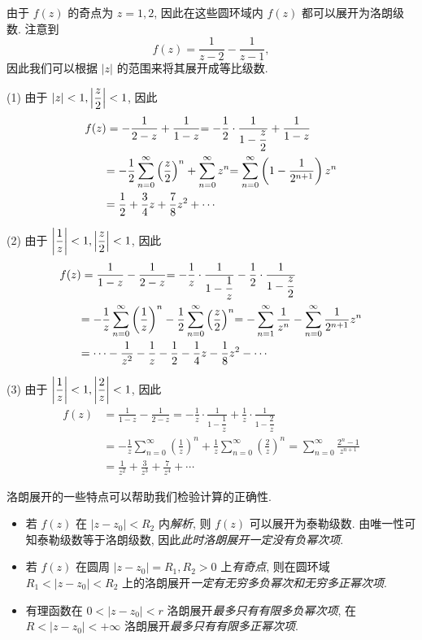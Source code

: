 \documentclass[nocolor,theme=doremi,lang=cn,11pt,chinese,twoside,openright,usesamecnt]{elegantbook}
\newcommand\enumnum[1]{{\mdseries\upshape\textcolor[rgb]{.2,.2,.7}{(#1)}}}
\begin{document}
\begin{solution}
	由于 $f(z)$ 的奇点为 $z=1,2$, 因此在这些圆环域内 $f(z)$ 都可以展开为洛朗级数.
	{注意到
		\[f(z)=\frac1{z-2}-\frac1{z-1},\]
		因此我们可以根据 $|z|$ 的范围来将其展开成等比级数.}

	\enumnum1 由于 $|z|<1,\left|\dfrac z2\right|<1$,
	{因此
		\begin{align*}
			f(z)&=-\frac1{2-z}+\frac1{1-z}
			{=-\frac{1}{2}\cdot\frac1{1-\dfrac z2}+\frac1{1-z}}\\
			&{=-\frac{1}{2}\sum_{n=0}^\infty\left(\frac z2\right)^n+\sum_{n=0}^\infty z^n}
			{=\sum_{n=0}^\infty\left(1-\frac1{2^{n+1}}\right)z^n}\\
			&{=\frac{1}{2} +\frac34z+\frac78z^2+\cdots}
		\end{align*}}

	\enumnum2 由于 $\left|\dfrac1z\right|<1,\left|\dfrac z2\right|<1$, 
	{因此
		\begin{align*}
			f(z)&=\frac1{1-z}-\frac1{2-z}
			{=-\frac1z\cdot\frac1{1-\dfrac1z}-\frac{1}{2}\cdot\frac1{1-\dfrac z2}}\\
			&{=-\frac1z\sum_{n=0}^\infty \left(\frac1z\right)^n-\frac{1}{2}\sum_{n=0}^\infty\left(\frac z2\right)^n}
			{=-\sum_{n=1}^{\infty}\frac1{z^n}-\sum_{n=0}^\infty\frac1{2^{n+1}}z^n}\\
			&{=\cdots-\frac1{z^2}-\frac1z-\frac{1}{2} -\frac14z-\frac18z^2-\cdots}
		\end{align*}}

	\enumnum3 由于 $\left|\dfrac1z\right|<1,\left|\dfrac2z\right|<1$, {因此
		\begin{align*}
			f(z)&=\frac1{1-z}-\frac1{2-z}
				{=-\frac1z\cdot\frac1{1-\dfrac1z}+\frac1z\cdot\frac1{1-\dfrac2z}}\\
			&{=-\frac1z\sum_{n=0}^\infty \left(\frac1z\right)^n+\frac1z\sum_{n=0}^\infty\left(\frac2z\right)^n}
				{=\sum_{n=0}^\infty\frac{2^n-1}{z^{n+1}}}\\
			&{=\frac1{z^2}+\frac3{z^3}+\frac7{z^4}+\cdots}
		\end{align*}}
\end{solution}

洛朗展开的一些特点可以帮助我们检验计算的正确性.
\begin{itemize}
	\item  若 $f(z)$ 在 $|z-z_0|<R_2$ 内\emph{解析},
		则 $f(z)$ 可以展开为泰勒级数.
		由唯一性可知泰勒级数等于洛朗级数,
		因此\emph{此时洛朗展开一定没有负幂次项}.
	\item 若 $f(z)$ 在圆周 $|z-z_0|=R_1,R_2>0$ 上\emph{有奇点}, 则在圆环域 $R_1<|z-z_0|<R_2$ 上的洛朗展开\emph{一定有无穷多负幂次和无穷多正幂次项}.
	\item 有理函数在 $0<|z-z_0|<r$ 洛朗展开\emph{最多只有有限多负幂次项}, 在 $R<|z-z_0|<+\infty$ 洛朗展开\emph{最多只有有限多正幂次项}.
\end{itemize}
\end{document}
